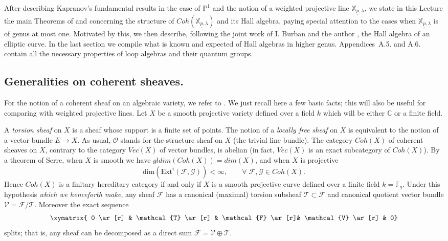 \documentclass[a4paper,10pt]{amsart}
\def\C{\mathbb{C}}
\numberwithin{equation}{section}
\begin{document}
\vspace{.1in}

After describing Kapranov's fundamental results in the case of $\mathbb{P}^1$ and the notion of a weighted projective line $\mathbb{X}_{\underline{p},\underline{\lambda}}$, we state in this Lecture the main Theorems of \cite{CB2} and \cite{SDuke} concerning the structure of $Coh(\mathbb{X}_{\underline{p},\underline{\lambda}})$ and its Hall algebra, paying special attention to the cases when $\mathbb{X}_{\underline{p},\underline{\lambda}}$ is of genus at most one. Motivated by this, we then describe, following the joint work of I. Burban and the author \cite{BS}, the Hall algebra of an elliptic curve. In the last section we compile what is known and expected of Hall algebras in higher genus. Appendices~A.5. and A.6. contain all the necessary properties of loop algebras and their quantum groups.

\vspace{.2in}

\subsection{Generalities on coherent sheaves.}

\vspace{.15in}

For the notion of a coherent sheaf on
an algebraic variety, we refer to \cite{Hart}. We just recall here a few basic facts; this will also be useful for comparing with weighted projective lines. Let $X$ be a smooth projective variety defined over a field $k$ which will be either $\C$ or a finite field.

A \textit{torsion sheaf} on $X$ is a sheaf whose support is a finite set of points. The notion of a \textit{locally free sheaf} on $X$ is equivalent to the notion of a vector bundle $E \to X$. As usual, $\mathcal{O}$ stands for the structure sheaf on $X$ (the trivial line bundle).
The category $Coh(X)$ of coherent sheaves on $X$, contrary to the category $Vec(X)$ of vector bundles, is abelian
(in fact, $Vec(X)$ is an exact subcategory of $Coh(X)$). By a theorem of Serre, when $X$ is smooth
we have ${gldim}(Coh(X))={dim}(X)$, and when $X$ is projective
$$\text{dim}(\text{Ext}^i(\mathcal{F},\mathcal{G})) < \infty,\qquad {\forall}\; \mathcal{F},\mathcal{G} \in Coh(X).$$
Hence $Coh(X)$ is a finitary hereditary category if and only if $X$ is a smooth projective curve defined over a finite field $k=\mathbb{F}_q$. Under this hypothesis \textit{which we henceforth make}, any sheaf $\mathcal{F}$ has a canonical (maximal) torsion subsheaf $\mathcal{T} \subset \mathcal{F}$ and canonical quotient vector bundle
$\mathcal{V}=\mathcal{F}/\mathcal{T}$. Moreover the exact sequence
$$\xymatrix{ 0 \ar[r] & \mathcal{T} \ar[r] & \mathcal{F} \ar[r]& \mathcal{V} \ar[r] & 0}$$
splits; that is, any sheaf can be decomposed as a direct sum $\mathcal{F}=\mathcal{V} \oplus \mathcal{T}$.
\end{document}
